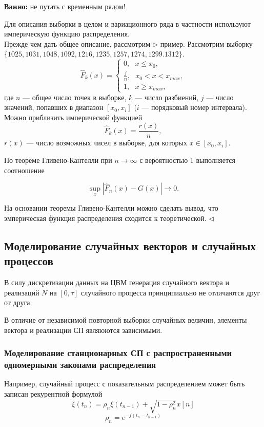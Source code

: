 \documentclass[12pt]{article}
\begin{document}
\begin{framed}
    \textbf{Важно:} не путать с временным рядом!
\end{framed}

Для описания выборки в целом и вариационного ряда в частности используют империческую функцию распределения.\\

Прежде чем дать общее описание, рассмотрим $\triangleright$ пример. Рассмотрим выборку  $\{ 1025, 1031, 1048, 1092, 1216, 1235, 1257, 1274, 1299. 1312 \}$.
\[ \hat{F}_k(x) = 
\begin{cases}
    0, ~~~x \leq x_0,\\
    \frac{j}{n}, ~~~x_0 < x < x_{max},\\
    1, ~~~ x \geq x_{max},
\end{cases}
\]
где $n$ --- общее число точек в выборке, $k$ --- число разбиений, $j$ --- число значений, попавших в диапазон $[x_0, x_i]$ ($i$ --- порядковый номер интервала). Можно приблизить имперической функцией
\[ \hat{F}_k (x) = \frac{r(x)}{n}, \]
$r(x)$ --- число возможных чисел в выборке, для которых $x \in [x_0, x_i]$. 

По теореме Гливено-Кантелли при $n \to \infty$ с вероятностью 1 выполняется соотношение

\[ \sup_x \left| \hat{F}_n(x) - G(x) \right| \to 0. \]

На основании теоремы Гливено-Кантелли можно сделать вывод, что эмперическая функция распределения сходится к теоретической.
$\triangleleft$

  
\newpage
\subsection{Моделирование случайных векторов и случайных процессов}
В силу дискретизации данных на ЦВМ генерация случайного вектора и реализаций $N$ на $[0, \tau]$ случайного процесса принципиально не отличаются друг от друга.

В отличие от независимой повторной выборки случайных величин, элементы вектора и реализации СП являюются зависимыми.

\subsubsection{Моделирование станционарных СП с распространенными одномерными законами распределения}
Например, случайный процесс с показательным распределением может быть записан рекурентной формулой
\[ \xi(t_n) = \rho_n \xi (t_{n-1}) + \sqrt{1 - \rho_n^2} x [n] \label{eq:xi} \]
\[ \rho_n = e^{-f (t_n - t_{n-1})} \]
\end{document}
